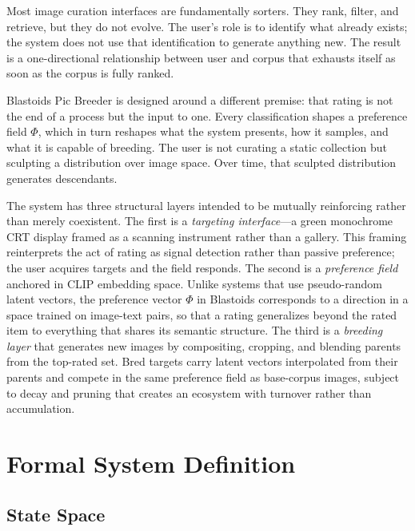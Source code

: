 \documentclass[12pt, a4paper]{article}
\theoremstyle{definition}
\begin{document}
Most image curation interfaces are fundamentally sorters. They rank, filter, and retrieve, but they do not evolve. The user's role is to identify what already exists; the system does not use that identification to generate anything new. The result is a one-directional relationship between user and corpus that exhausts itself as soon as the corpus is fully ranked.

Blastoids Pic Breeder is designed around a different premise: that rating is not the end of a process but the input to one. Every classification shapes a preference field $\Phi$, which in turn reshapes what the system presents, how it samples, and what it is capable of breeding. The user is not curating a static collection but sculpting a distribution over image space. Over time, that sculpted distribution generates descendants.

The system has three structural layers intended to be mutually reinforcing rather than merely coexistent. The first is a \textit{targeting interface}---a green monochrome CRT display framed as a scanning instrument rather than a gallery. This framing reinterprets the act of rating as signal detection rather than passive preference; the user acquires targets and the field responds. The second is a \textit{preference field} anchored in CLIP embedding space. Unlike systems that use pseudo-random latent vectors, the preference vector $\Phi$ in Blastoids corresponds to a direction in a space trained on image-text pairs, so that a rating generalizes beyond the rated item to everything that shares its semantic structure. The third is a \textit{breeding layer} that generates new images by compositing, cropping, and blending parents from the top-rated set. Bred targets carry latent vectors interpolated from their parents and compete in the same preference field as base-corpus images, subject to decay and pruning that creates an ecosystem with turnover rather than accumulation.

\section{Formal System Definition}

\subsection{State Space}
\end{document}
